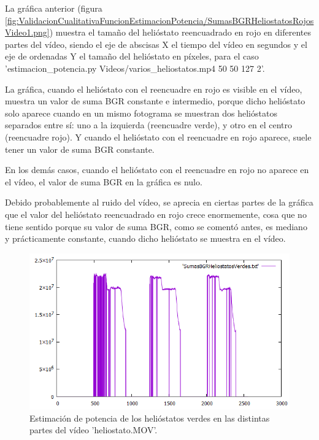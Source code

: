 La gráfica anterior (figura \ref{fig:ValidacionCualitativaFuncionEstimacionPotencia/SumasBGRHeliostatosRojosVideo1.png}) muestra el tamaño del helióstato reencuadrado en rojo en diferentes partes del vídeo, siendo el eje de abscisas X el tiempo del vídeo en segundos y el eje de ordenadas Y el tamaño del helióstato en píxeles, para el caso 'estimacion\_potencia.py Videos/varios\_heliostatos.mp4 50 50 127 2'.

La gráfica, cuando el helióstato con el reencuadre en rojo es visible en el vídeo, muestra un valor de suma BGR constante e intermedio, porque dicho helióstato solo aparece cuando en un mismo fotograma se muestran dos helióstatos separados entre sí: uno a la izquierda (reencuadre verde), y otro en el centro (reencuadre rojo). Y cuando el helióstato con el reencuadre en rojo aparece, suele tener un valor de suma BGR constante.

En los demás casos, cuando el helióstato con el reencuadre en rojo no aparece en el vídeo, el valor de suma BGR en la gráfica es nulo.

Debido probablemente al ruido del vídeo, se aprecia en ciertas partes de la gráfica que el valor del helióstato reencuadrado en rojo crece enormemente, cosa que no tiene sentido porque su valor de suma BGR, como se comentó antes, es mediano y prácticamente constante, cuando dicho helióstato se muestra en el vídeo.

\begin{figure}[h!]
  	\centering
	\includegraphics[width=\textwidth]{ValidacionCualitativaFuncionEstimacionPotencia/SumasBGRHeliostatosVerdesVideo2.png}
	\caption{Estimación de potencia de los helióstatos verdes en las distintas partes del vídeo 'heliostato.MOV'.
	\label{fig:ValidacionCualitativaFuncionEstimacionPotencia/SumasBGRHeliostatosVerdesVideo2.png}}
\end{figure}

